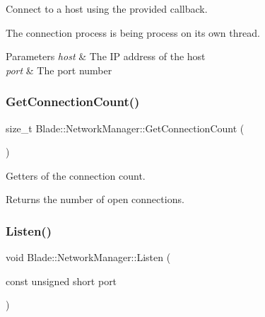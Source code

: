 Connect to a host using the provided callback. 

The connection process is being process on its own thread. 
\begin{DoxyParams}{Parameters}
{\em host} & The IP address of the host \\
\hline
{\em port} & The port number \\
\hline
\end{DoxyParams}
\mbox{\label{class_blade_1_1_network_manager_ac8dcbba66d285f6a14ad1bcfa346ae5e}} 
\subsubsection{\texorpdfstring{Get\+Connection\+Count()}{GetConnectionCount()}}
{\footnotesize\ttfamily size\+\_\+t Blade\+::\+Network\+Manager\+::\+Get\+Connection\+Count (\begin{DoxyParamCaption}{ }\end{DoxyParamCaption})\hspace{0.3cm}{\ttfamily [noexcept]}}



Getters of the connection count. 

\begin{DoxyReturn}{Returns}
the number of open connections. 
\end{DoxyReturn}
\mbox{\label{class_blade_1_1_network_manager_a1e097a251026499832bd7238adb48d8a}} 
\subsubsection{\texorpdfstring{Listen()}{Listen()}}
{\footnotesize\ttfamily void Blade\+::\+Network\+Manager\+::\+Listen (\begin{DoxyParamCaption}\item[{const unsigned short}]{port }\end{DoxyParamCaption})\hspace{0.3cm}{\ttfamily [noexcept]}}



